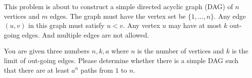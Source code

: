 This problem is about to construct a simple directed acyclic graph (DAG) 
of $n$ vertices and $m$ edges.
The graph must have the vertex set be $\{1,\ldots,n\}$. Any edge $(u,v)$ in this graph must satisfy $u < v$.
Any vertex $u$ may have at most $k$ out-going edges.
And multiple edges are not allowed.

You are given three numbers $n,k,a$ where $n$ is the number of vertices and $k$ is the limit of out-going edges.
Please determine whether there is a simple DAG such that there are at least $a^n$ paths from $1$ to $n$.
